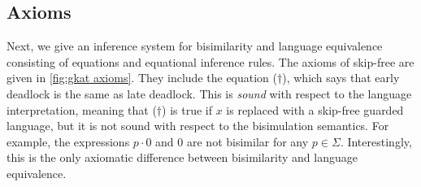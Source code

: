 \documentclass[orivec,envcountsect,envcountsame]{llncs}
\begin{document}






    \subsection{Axioms}
    Next, we give an inference system for bisimilarity and language equivalence consisting of equations and equational inference rules.
    The axioms of skip-free  \GKAT are given in \cref{fig:gkat axioms}.
    They include the equation (\(\dagger\)), which says that early deadlock is the same as late deadlock.
    This is \emph{sound} with respect to the language interpretation, meaning that (\(\dagger\)) is true if \(x\) is replaced with a skip-free guarded language, but it is not sound with respect to the bisimulation semantics.
    For example, the expressions \(p \cdot 0\) and \(0\) are not bisimilar for any \(p \in \Sigma\).
    Interestingly, this is the only axiomatic difference between bisimilarity and language equivalence.
\end{document}
